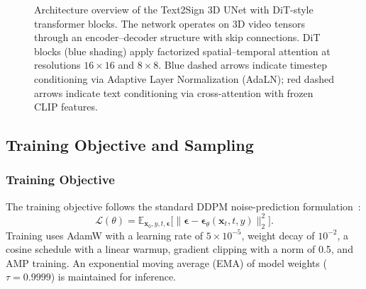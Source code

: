 \documentclass{ieeeaccess}
\begin{document}
\begin{figure}[t]
{}
    \caption{Architecture overview of the Text2Sign 3D UNet with DiT-style transformer blocks. The network operates on 3D video tensors through an encoder--decoder structure with skip connections. DiT blocks (blue shading) apply factorized spatial--temporal attention at resolutions $16\times16$ and $8\times8$. Blue dashed arrows indicate timestep conditioning via Adaptive Layer Normalization (AdaLN); red dashed arrows indicate text conditioning via cross-attention with frozen CLIP features.}
    \label{fig:architecture}
\end{figure}

\subsection{Training Objective and Sampling}
\label{subsec:training_sampling}

\subsubsection{Training Objective}

The training objective follows the standard DDPM noise-prediction formulation~\cite{ho2020ddpm}:
\begin{equation}
    \mathcal{L}(\theta) = \mathbb{E}_{\mathbf{x}_0, y, t, \boldsymbol{\epsilon}} \bigl[\lVert \boldsymbol{\epsilon} - \boldsymbol{\epsilon}_\theta(\mathbf{x}_t, t, y) \rVert_2^2\bigr].
    \label{eq:loss}
\end{equation}
Training uses AdamW with a learning rate of $5 \times 10^{-5}$, weight decay of $10^{-2}$, a cosine schedule with a linear warmup, gradient clipping with a norm of 0.5, and AMP training. An exponential moving average (EMA) of model weights ($\tau = 0.9999$) is maintained for inference.
\end{document}
